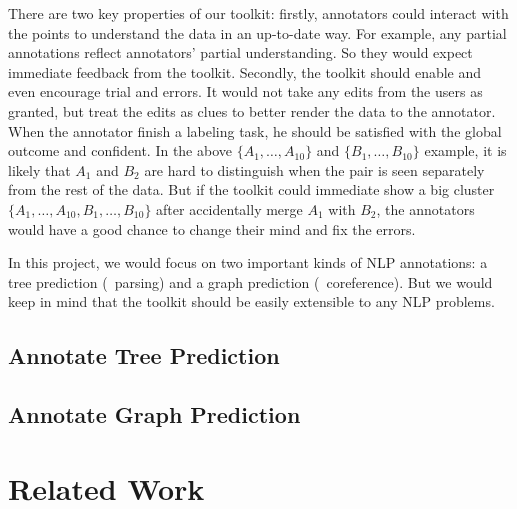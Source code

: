 \documentclass[11pt]{article}
\begin{document}
There are two key properties of our toolkit: firstly, annotators could interact with the points to understand the data in an up-to-date way. For example, any partial annotations reflect annotators' partial understanding. So they would expect immediate feedback from the toolkit. Secondly, the toolkit should enable and even encourage trial and errors. It would not take any edits from the users as granted, but treat the edits as clues to better render the data to the annotator. When the annotator finish a labeling task, he should be satisfied with the global outcome and confident. In the above $\{A_1,\ldots,A_{10}\}$ and $\{B_1,\ldots,B_{10}\}$ example, it is likely that $A_1$ and $B_2$ are hard to distinguish when the pair is seen separately from the rest of the data. But if the toolkit could immediate show a big cluster $\{A_1,\ldots,A_{10}, B_1,\ldots,B_{10}\}$ after accidentally merge $A_1$ with $B_2$, the annotators would have a good chance to change their mind and fix the errors. 

 In this project, we would focus on two important kinds of NLP annotations: a tree prediction (\eg\  parsing) and a graph prediction (\eg\ coreference). But we would keep in mind that the toolkit should be easily extensible to any NLP problems. 

\subsection{Annotate Tree Prediction}
\subsection{Annotate Graph Prediction}

\section{Related Work}




%


\end{document}
